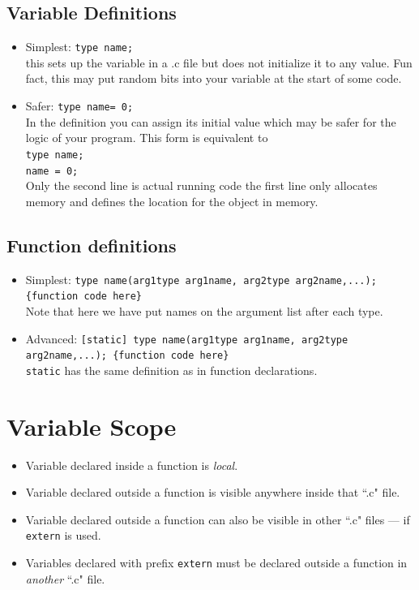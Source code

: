 \subsection{Variable Definitions}
\begin{itemize}
  \item Simplest: {\tt type name;}  \\
  this sets up the variable in a .c file but does not initialize
  it to any value.  Fun fact, this may put random bits into your
  variable at the start of some code.
  \item Safer: {\tt type name= 0;}\\
  In the definition you can assign its initial value which may
  be safer for the logic of your program.   This form is equivalent
  to\\
  {\tt type name;}\\
  {\tt name = 0;}\\
  Only the second line is actual running code the first line only
  allocates memory and defines the location for the object in memory.
\end{itemize}


\subsection{Function definitions}
\begin{itemize}
  \item Simplest:  {\tt type name(arg1type arg1name, arg2type arg2name,...); \{function code here\}} \\
  Note that here we have put names on the argument list after
  each type.
  \item Advanced: {\tt [static] type name(arg1type arg1name, arg2type arg2name,...); \{function code here\} }\\
  {\tt static} has the same definition as in function declarations.
\end{itemize}




\section{Variable Scope}

\begin{itemize}
	\item Variable declared  inside a function is {\it local}.
	\item Variable declared outside a function is visible anywhere
inside that ``.c" file.
	\item Variable declared outside a function can also be visible in
other ``.c" files --- if {\tt extern} is used.
	\item Variables declared with prefix {\tt extern} must be declared
outside a function in {\it another } ``.c" file.
\end{itemize}

